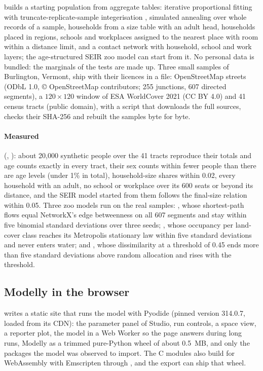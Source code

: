  builds a starting population from aggregate tables: iterative
proportional fitting \citep{deming1940least} with truncate-replicate-sample integerisation
\citep{lovelace2013truncate}, simulated annealing over whole records of a sample, households
from a size table with an adult head, households placed in regions, schools and workplaces
assigned to the nearest place with room within a distance limit, and a contact network with
household, school and work layers; the age-structured SEIR zoo model can start from it. No
personal data is bundled: the marginals of the tests are made up. Three small samples of
Burlington, Vermont, ship with their licences in a  file: OpenStreetMap streets
(ODbL 1.0, © OpenStreetMap contributors; 255 junctions, 607 directed segments), a $120
\times 120$ window of ESA WorldCover 2021 \citep{zanaga2022worldcover} (CC BY 4.0) and 41
census tracts (public domain), with a script that downloads the full sources, checks their
SHA-256 and rebuilt the samples byte for byte.

\paragraph{Measured} (, ): about 20,000 synthetic people
over the 41 tracts reproduce their totals and age counts exactly in every tract, their sex
counts within fewer people than there are age levels (under 1\% in total), household-size
shares within 0.02, every household with an adult, no school or workplace over its 600
seats or beyond its distance, and the SEIR model started from them follows the final-size
relation within 0.05. Three zoo models run on the real samples: , whose
shortest-path flows equal NetworkX's edge betweenness on all 607 segments and stay within
five binomial standard deviations over three seeds; , whose
occupancy per land-cover class reaches its Metropolis stationary law within five standard
deviations and never enters water; and , whose dissimilarity at a
threshold of 0.45 ends more than five standard deviations above random allocation and rises
with the threshold.

\subsection{Modelly in the browser}
\label{sec:browser}

 writes a static site that runs the model with Pyodide
\citep{pyodide} (pinned version 314.0.7, loaded from its CDN): the parameter panel of Studio,
run controls, a space view, a reporter plot, the model in a Web Worker so the page answers
during long runs, Modelly as a trimmed pure-Python wheel of about 0.5~MB, and only the
packages the model was observed to import. The C modules also build for WebAssembly with
Emscripten through , and the export can ship that wheel.

